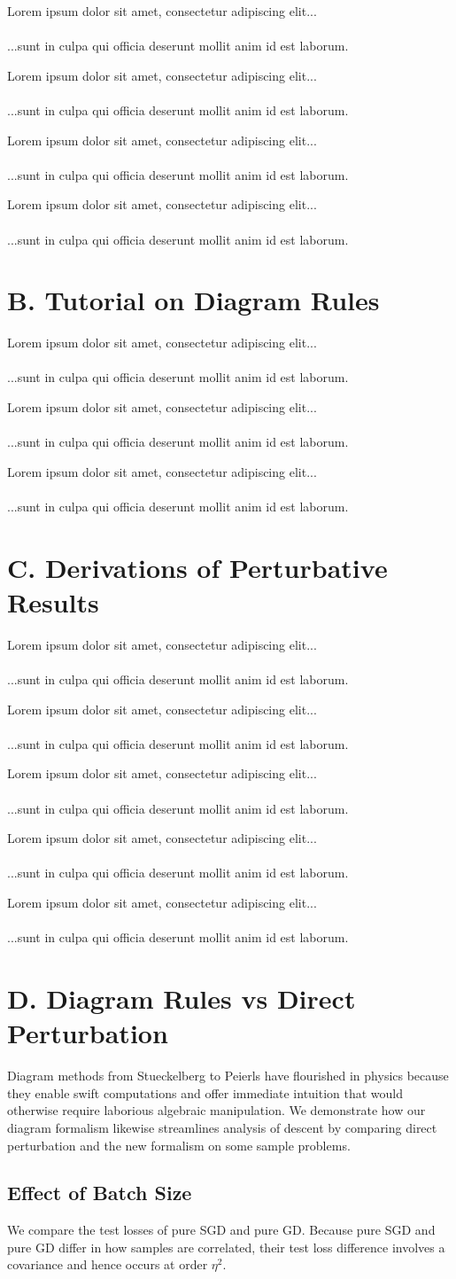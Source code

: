 \documentclass{article}
\newcommand{\lorem}[1]{
    Lorem ipsum dolor sit amet, consectetur adipiscing elit...\\
    \nopagebreak\vspace{#1cm} \ \\
    ...sunt in culpa qui officia deserunt mollit anim id est laborum.
}
\begin{document}
    \lorem{3}
    \lorem{3}
    \lorem{3}
    \lorem{3}

\section*{B. Tutorial on Diagram Rules}
    \lorem{3}
    \lorem{3}
    \lorem{3}

\section*{C. Derivations of Perturbative Results}

    \lorem{3}
    \lorem{3}
    \lorem{3}
    \lorem{3}
    \lorem{3}

\section*{D. Diagram Rules vs Direct Perturbation}
    Diagram methods from Stueckelberg to Peierls have flourished in physics
    because they enable swift computations and offer immediate intuition that
    would otherwise require laborious algebraic manipulation.  We demonstrate
    how our diagram formalism likewise streamlines analysis of descent by
    comparing direct perturbation and the new formalism on some sample
    problems.

    \subsection*{Effect of Batch Size}
        We compare the test losses of pure SGD and pure GD.  Because pure
        SGD and pure GD differ in how samples are correlated, their test loss
        difference involves a covariance and hence occurs at order $\eta^2$.  
\end{document}
